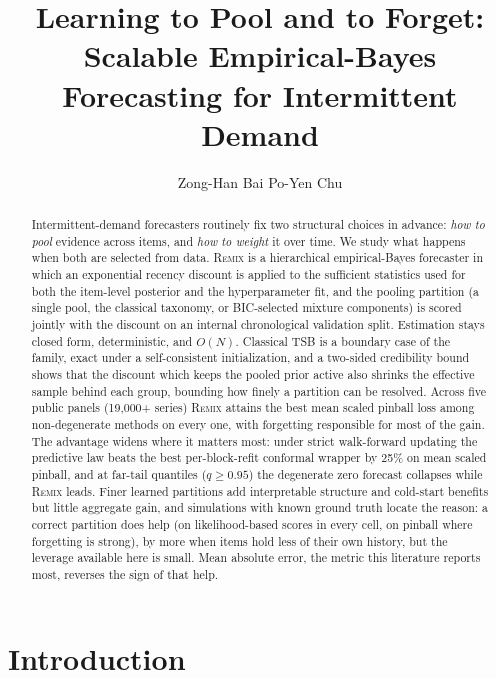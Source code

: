 \documentclass[twocolumn,10pt]{article}
\title{Learning to Pool and to Forget:\\
Scalable Empirical-Bayes Forecasting for Intermittent Demand}
\author{Zong-Han Bai \qquad Po-Yen Chu}
\date{}
\newcommand{\REMIX}{\textsc{Remix}}
\begin{document}
\maketitle

\begin{abstract}
Intermittent-demand forecasters routinely fix two structural choices in
advance: \emph{how to pool} evidence across items, and \emph{how to
weight} it over time. We study what happens when both are selected from
data. \REMIX{} is a hierarchical empirical-Bayes forecaster in which an
exponential recency discount is applied to the sufficient statistics used
for both the item-level posterior and the hyperparameter fit, and the
pooling partition (a single pool, the classical taxonomy, or
BIC-selected mixture components) is scored jointly with the discount on
an internal chronological validation split. Estimation stays closed form,
deterministic, and $O(N)$. Classical TSB is a boundary case of the
family, exact under a self-consistent initialization, and a two-sided
credibility bound shows that the discount which keeps the pooled prior
active also shrinks the effective sample behind each group, bounding how
finely a partition can be resolved. Across five public panels (19{,}000+ series) \REMIX{}
attains the best mean scaled pinball loss among non-degenerate methods on
every one, with forgetting responsible for most of the gain. The
advantage widens where it matters most: under strict walk-forward
updating the predictive law beats the best per-block-refit conformal
wrapper by 25\% on mean scaled pinball, and at far-tail quantiles
($q\ge0.95$) the degenerate zero forecast collapses while \REMIX{}
leads.
Finer learned partitions add interpretable structure and cold-start
benefits but little aggregate gain, and simulations with known ground
truth locate the reason: a correct partition does help (on
likelihood-based scores in every cell, on pinball where forgetting is
strong), by more when items hold less of their own history, but the
leverage available here is small. Mean absolute error, the metric
this literature reports most, reverses the sign of that help.
\end{abstract}

\section{Introduction}\label{sec:intro}
\end{document}
